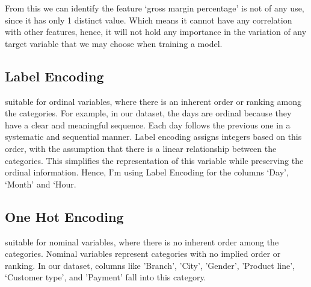 \newpage 
From this we can identify the feature ‘gross margin percentage’ is not of any use, since it has only 1 distinct value. Which means it cannot have any correlation with other features, hence, it will not hold any importance in the variation of any target variable that we may choose when training a model.

\begin{table}[htbp]
    \centering
    \label{tab:scaled_table}
\end{table}



\subsection{Label Encoding}

suitable for ordinal variables, where there is an inherent order or ranking among the categories. For example, in our dataset, the days are ordinal because they have a clear and meaningful sequence. Each day follows the previous one in a systematic and sequential manner. Label encoding assigns integers based on this order, with the assumption that there is a linear relationship between the categories. This simplifies the representation of this variable while preserving the ordinal information. Hence, I’m using Label Encoding for the columns ‘Day’, ‘Month’ and ‘Hour.

\subsection{One Hot Encoding}

suitable for nominal variables, where there is no inherent order among the categories. Nominal variables represent categories with no implied order or ranking. In our dataset, columns like 'Branch', 'City', 'Gender', 'Product line', ‘Customer type’, and 'Payment' fall into this category.
\newline

